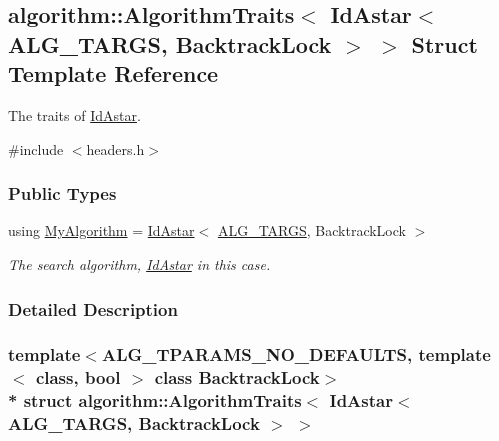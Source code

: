 \hypertarget{structalgorithm_1_1AlgorithmTraits_3_01IdAstar_3_01ALG__TARGS_00_01BacktrackLock_01_4_01_4}{}\subsection{algorithm\+:\+:Algorithm\+Traits$<$ Id\+Astar$<$ A\+L\+G\+\_\+\+T\+A\+R\+GS, Backtrack\+Lock $>$ $>$ Struct Template Reference}
\label{structalgorithm_1_1AlgorithmTraits_3_01IdAstar_3_01ALG__TARGS_00_01BacktrackLock_01_4_01_4}


The traits of \hyperlink{structIdAstar}{Id\+Astar}.  




{\ttfamily \#include $<$headers.\+h$>$}

\subsubsection*{Public Types}
\begin{DoxyCompactItemize}
\item 
using \hyperlink{structalgorithm_1_1AlgorithmTraits_3_01IdAstar_3_01ALG__TARGS_00_01BacktrackLock_01_4_01_4_a54ca71bba6245a4da57e152552880051}{My\+Algorithm} = \hyperlink{structalgorithm_1_1IdAstar}{Id\+Astar}$<$ \hyperlink{algorithm_8h_a425b5a86fe8dae889a8343e14267c3c0}{A\+L\+G\+\_\+\+T\+A\+R\+GS}, Backtrack\+Lock $>$\hypertarget{structalgorithm_1_1AlgorithmTraits_3_01IdAstar_3_01ALG__TARGS_00_01BacktrackLock_01_4_01_4_a54ca71bba6245a4da57e152552880051}{}\label{structalgorithm_1_1AlgorithmTraits_3_01IdAstar_3_01ALG__TARGS_00_01BacktrackLock_01_4_01_4_a54ca71bba6245a4da57e152552880051}

\begin{DoxyCompactList}\small\item\em The search algorithm, \hyperlink{structIdAstar}{Id\+Astar} in this case. \end{DoxyCompactList}\end{DoxyCompactItemize}


\subsubsection{Detailed Description}
\subsubsection*{template$<$A\+L\+G\+\_\+\+T\+P\+A\+R\+A\+M\+S\+\_\+\+N\+O\+\_\+\+D\+E\+F\+A\+U\+L\+TS, template$<$ class, bool $>$ class Backtrack\+Lock$>$\\*
struct algorithm\+::\+Algorithm\+Traits$<$ Id\+Astar$<$ A\+L\+G\+\_\+\+T\+A\+R\+G\+S, Backtrack\+Lock $>$ $>$}

